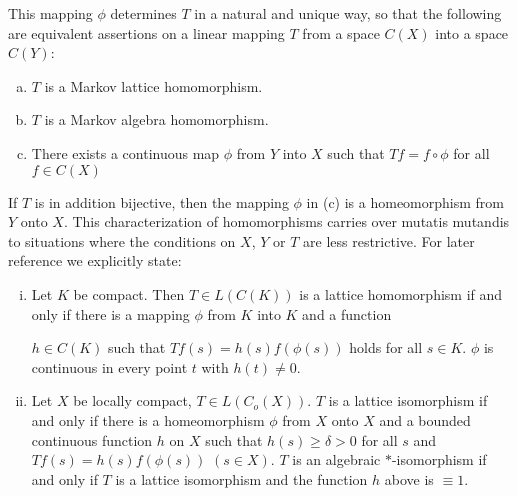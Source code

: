 This mapping $\phi$ determines $T$ in a natural and unique way, so that the following are equivalent assertions on a linear mapping $T$ from a space $C(X)$ into a space $C(Y)$:
\begin{enumerate}[(a)]
\item 
$T$ is a Markov lattice homomorphism.
\item 
$T$ is a Markov algebra homomorphism.
\item 
There exists a continuous map $\phi$ from $Y$ into $X$ such that $Tf = f \circ \phi$ for all $f \in C(X)$
\end{enumerate}
If $T$ is in addition bijective, then the mapping $\phi$ in (c) is a homeomorphism from $Y$ onto $X$.
This characterization of homomorphisms carries over mutatis mutandis to situations where the conditions on $X$, $Y$ or $T$ are less restrictive.
For later reference we explicitly state:
\begin{enumerate}[(i)]
\item Let $K$ be compact. Then $T \in L(C(K))$ is a lattice homomorphism if and only if there is a mapping $\phi$ from $K$ into $K$ and a function


$h \in C(K)$ such that $Tf(s) = h(s)f(\phi(s))$ holds for all $s \in K$.
$\phi$ is continuous in every point $t$ with $h(t) \neq 0$.


\item Let $X$ be locally compact, $T \in L(C_{o}(X))$.
$T$ is a lattice isomorphism if and only if there is a homeomorphism $\phi$ from $X$ onto $X$ and a bounded continuous function $h$ on $X$ such that $h(s) \geq \delta > 0$ for all $s$ and $Tf(s) = h(s)f(\phi(s))$ $(s \in X)$.
$T$ is an algebraic $*$-isomorphism if and only if $T$ is a lattice isomorphism and the function $h$ above is $\equiv 1$.
\end{enumerate}






